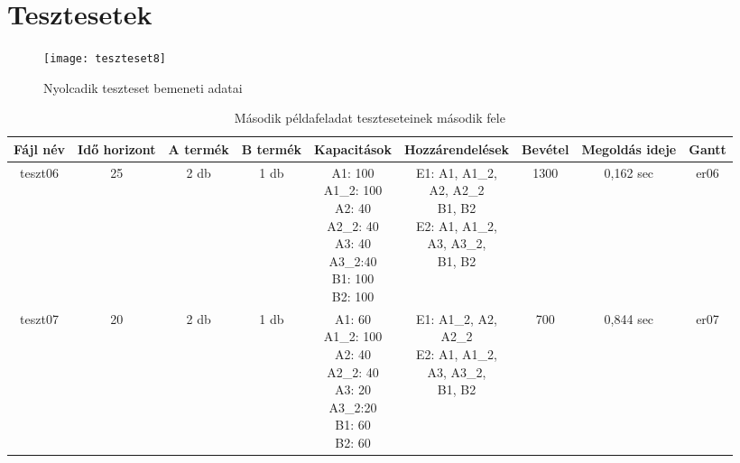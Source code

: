 \appendix
\chapter{Tesztesetek}

\begin{figure}[H]
\begin{center}
\texttt{[image: teszteset8]}
\caption{Nyolcadik teszteset bemeneti adatai}
\label{teszteset8}
\end{center}
\end{figure}

\begin{table}
	\begin{center}
	\caption{Második példafeladat teszteseteinek második fele}
  	\captionsetup[table]{skip=10pt}
  	\label{tab:table3}  	
  	\begin{sideways}  	  	
  		\begin{tabular}{|c|c|c|c|c|c|c|c|c|}
  		\hline
		Fájl név & Idő horizont & A termék & B termék & Kapacitások & Hozzárendelések & Bevétel & Megoldás ideje & Gantt \\
		\hline
		teszt06 & 25 & 2 db & 1 db & \makecell{A1: 100 \\ A1\_2: 100\\A2: 40\\A2\_2: 40\\A3: 40\\A3\_2:40\\B1: 100\\B2: 100} & \makecell{E1: A1, A1\_2,\\A2, A2\_2 \\B1, B2 \\E2: A1, A1\_2,\\ A3, A3\_2, \\ B1, B2} & 1300 & 0,162 sec & er06 \\
		\hline	
		teszt07 & 20 & 2 db & 1 db & \makecell{A1: 60\\A1\_2: 100\\A2: 40\\A2\_2: 40\\A3: 20\\A3\_2:20\\B1: 60\\B2: 60} & \makecell{E1: A1\_2, A2,\\A2\_2 \\ E2: A1, A1\_2,\\ A3, A3\_2, \\ B1, B2} & 700 & 0,844 sec & er07 \\

\end{tabular}
\end{sideways}
\end{center}
\end{table}
